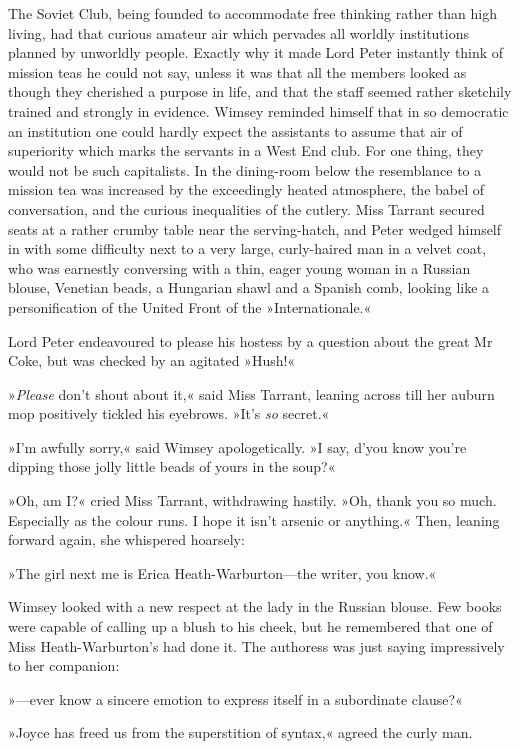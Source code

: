 The Soviet Club, being founded to accommodate free thinking rather than high living, had that curious amateur air which pervades all worldly institutions planned by unworldly people. Exactly why it made Lord Peter instantly think of mission teas he could not say, unless it was that all the members looked as though they cherished a purpose in life, and that the staff seemed rather sketchily trained and strongly in evidence. Wimsey reminded himself that in so democratic an institution one could hardly expect the assistants to assume that air of superiority which marks the servants in a West End club. For one thing, they would not be such capitalists. In the dining-room below the resemblance to a mission tea was increased by the exceedingly heated atmosphere, the babel of conversation, and the curious inequalities of the cutlery. Miss Tarrant secured seats at a rather crumby table near the serving-hatch, and Peter wedged himself in with some difficulty next to a very large, curly-haired man in a velvet coat, who was earnestly conversing with a thin, eager young woman in a Russian blouse, Venetian beads, a Hungarian shawl and a Spanish comb, looking like a personification of the United Front of the »Internationale.«

Lord Peter endeavoured to please his hostess by a question about the great Mr Coke, but was checked by an agitated »Hush!«

»\textit{Please} don't shout about it,« said Miss Tarrant, leaning across till her auburn mop positively tickled his eyebrows. »It's \textit{so} secret.«

»I'm awfully sorry,« said Wimsey apologetically. »I say, d'you know you're dipping those jolly little beads of yours in the soup?«

»Oh, am I?« cried Miss Tarrant, withdrawing hastily. »Oh, thank you so much. Especially as the colour runs. I hope it isn't arsenic or anything.« Then, leaning forward again, she whispered hoarsely:

»The girl next me is Erica Heath-Warburton—the writer, you know.«

Wimsey looked with a new respect at the lady in the Russian blouse.  Few books were capable of calling up a blush to his cheek, but he remembered that one of Miss Heath-Warburton's had done it. The authoress was just saying impressively to her companion:

»—ever know a sincere emotion to express itself in a subordinate clause?«

»Joyce has freed us from the superstition of syntax,« agreed the curly man.

